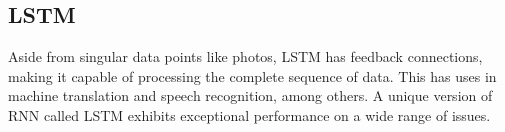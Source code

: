     \subsection{LSTM}
    Aside from singular data points like photos, LSTM has feedback connections, making it capable of processing the complete sequence of data. This has uses in machine translation and speech recognition, among others. A unique version of RNN called LSTM exhibits exceptional performance on a wide range of issues.

